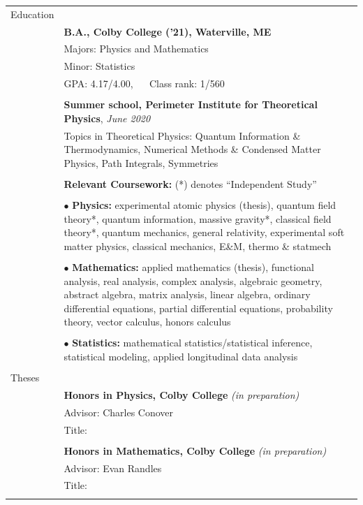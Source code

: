 \documentclass[10pt]{article}
\begin{document}
\noindent \begin{longtable}{ l p{14.5cm}   }

	
  \large{Education}    	& \\ 
  						& \textbf{B.A., Colby College ('21), Waterville, ME} \\
     				 	& Majors: Physics and Mathematics \\
     				 	& Minor: Statistics  \\
     					& GPA: 4.17/4.00, $\quad$ Class rank: 1/560 \\
	 					& \\ 

	 					&\textbf{Summer school, Perimeter Institute for Theoretical Physics}, \textit{June 2020} \\
	 					& Topics in Theoretical Physics: Quantum Information \& Thermodynamics, Numerical Methods \& Condensed Matter Physics, Path Integrals, Symmetries \\
	 					&\\
	 					
	 					& \textbf{Relevant Coursework:} (*) denotes ``Independent Study'' \\ \vspace{-12pt}
	 					& \\
	 					& $\bullet$ \textbf{Physics:} experimental atomic physics (thesis), quantum field theory*, quantum information, massive gravity*, classical field theory*, quantum mechanics,  general relativity, experimental soft matter physics, classical mechanics, E\&M, thermo \& statmech\\  \vspace{-9pt}
	 					& \\
	 					& $\bullet$ \textbf{Mathematics:} applied mathematics (thesis), functional analysis, real analysis, complex analysis, algebraic geometry, abstract algebra, matrix analysis, linear algebra, ordinary differential equations, partial differential equations, probability theory, vector calculus, honors calculus\\   \vspace{-9pt}
	 					& \\ 
	 					& $\bullet$ \textbf{Statistics:} mathematical statistics/statistical inference,  statistical modeling, applied longitudinal data analysis\\
	 					& \\
	 					
	 					

\large{Theses}
&\\
& \textbf{Honors in Physics, Colby College} \textit{(in preparation)}\\
& Advisor: Charles Conover\\
& Title: \\
& \\
& \textbf{Honors in Mathematics, Colby College} \textit{(in preparation)}\\
& Advisor: Evan Randles\\
& Title: \\
&\\ 
    

\end{longtable}
\end{document}
